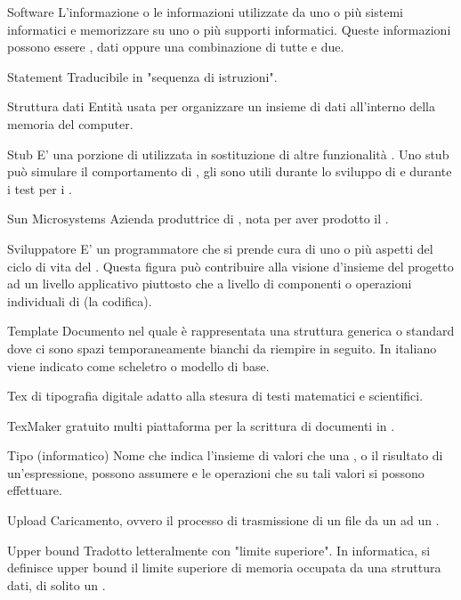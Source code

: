 \elemento
{Software}
{L'informazione o le informazioni utilizzate da uno o più sistemi informatici e memorizzare su uno o più supporti informatici. Queste informazioni possono essere , dati oppure una combinazione di tutte e due.}

\elemento
{Statement}
{Traducibile in "sequenza di istruzioni".}

\elemento
{Struttura dati}
{Entità usata per organizzare un insieme di dati all'interno della memoria del computer.}

\elemento
{Stub}
{E' una porzione di  utilizzata in sostituzione di altre funzionalità . Uno stub può simulare il comportamento di , gli  sono utili durante lo sviluppo di  e durante i test per i .}

\elemento
{Sun Microsystems}
{Azienda produttrice di , nota per aver prodotto il  .}

\elemento
{Sviluppatore}
{E' un programmatore che si prende cura di uno o più aspetti del ciclo di vita del . Questa figura può contribuire alla visione d'insieme del progetto ad un livello applicativo piuttosto che a livello di componenti o operazioni individuali di  (la codifica).}


\elemento
{Template}
{Documento nel quale è rappresentata una struttura generica o standard dove ci sono spazi temporaneamente bianchi da riempire in seguito. In italiano viene indicato come scheletro o modello di base.}

\elemento
{Tex}
{ di tipografia digitale adatto alla stesura di testi matematici e scientifici.}

\elemento
{TexMaker}
{ gratuito multi piattaforma per la scrittura di documenti in .}

\elemento
{Tipo (informatico)}
{Nome che indica l'insieme di valori che una , o il risultato di un'espressione, possono assumere e le operazioni che su tali valori si possono effettuare.}


\elemento
{Upload}
{Caricamento, ovvero il processo di trasmissione di un file da un  ad un .}

\elemento
{Upper bound}
{Tradotto letteralmente con "limite superiore". In informatica, si definisce upper bound il limite superiore di memoria occupata da una struttura dati, di solito un .}

